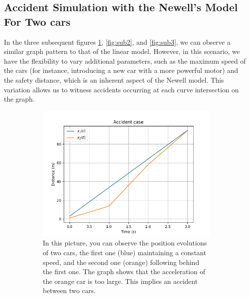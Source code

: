 \documentclass{article}
\begin{document}
	\subsection{Accident Simulation with the Newell's Model For Two cars}
	
	In the three subsequent figures \ref{fig:sub1}, \ref{fig:sub2}, and \ref{fig:sub3}, we can observe a similar graph pattern to that of the linear model. However, in this scenario, we have the flexibility to vary additional parameters, such as the maximum speed of the cars (for instance, introducing a new car with a more powerful motor) and the safety distance, which is an inherent aspect of the Newell model. This variation allows us to witness accidents occurring at each curve intersection on the graph.
	
	
	\begin{figure}[H]
		\centering
		\begin{subfigure}[b]{0.45\textwidth}
			\centering
			\includegraphics[width=\textwidth]{1W2_Acc1.png}
			\caption{In this picture, you can observe the position evolutions of two cars, the first one (blue) maintaining a constant speed, and the second one (orange) following behind the first one. The graph shows that the acceleration of the orange car is too large. This implies an accident between two cars.}
			\label{fig:sub1}
		\end{subfigure}
		\hfill
		\begin{subfigure}[b]{0.45\textwidth}
			\centering

\end{subfigure}
\end{figure}
\end{document}
